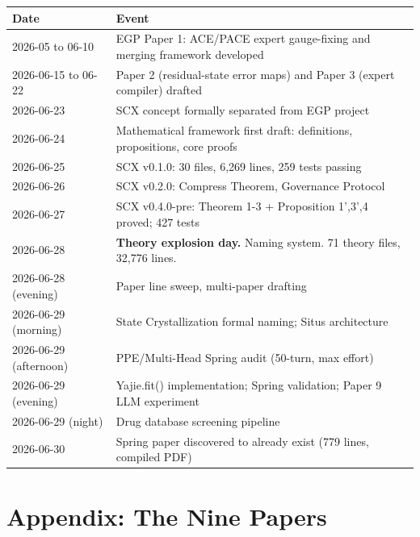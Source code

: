 \documentclass[12pt,a4paper]{ctexart}
\begin{document}
\begin{table}[htbp]
\centering
\begin{tabular}{@{}ll@{}}
\toprule
Date & Event \\
\midrule
2026-05 to 06-10 & EGP Paper 1: ACE/PACE expert gauge-fixing and merging framework developed \\
2026-06-15 to 06-22 & Paper 2 (residual-state error maps) and Paper 3 (expert compiler) drafted \\
2026-06-23 & SCX concept formally separated from EGP project \\
2026-06-24 & Mathematical framework first draft: definitions, propositions, core proofs \\
2026-06-25 & SCX v0.1.0: 30 files, 6,269 lines, 259 tests passing \\
2026-06-26 & SCX v0.2.0: Compress Theorem, Governance Protocol \\
2026-06-27 & SCX v0.4.0-pre: Theorem 1-3 + Proposition 1',3',4 proved; 427 tests \\
2026-06-28 & \textbf{Theory explosion day.} Naming system. 71 theory files, 32,776 lines. \\
2026-06-28 (evening) & Paper line sweep, multi-paper drafting \\
2026-06-29 (morning) & State Crystallization formal naming; Situs architecture \\
2026-06-29 (afternoon) & PPE/Multi-Head Spring audit (50-turn, max effort) \\
2026-06-29 (evening) & Yajie.fit() implementation; Spring validation; Paper 9 LLM experiment \\
2026-06-29 (night) & Drug database screening pipeline \\
2026-06-30 & Spring paper discovered to already exist (779 lines, compiled PDF) \\
\bottomrule
\end{tabular}
\end{table}

\section*{Appendix: The Nine Papers}
\end{document}
